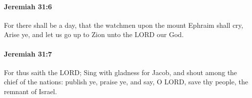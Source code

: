 		\paragraph{Jeremiah 31:6} %
			\label{JEREMIAH-31-6}

			For there shall be a day, that the watchmen upon the mount Ephraim shall cry, Arise ye, and let us go up to Zion unto the LORD our God.


		\paragraph{Jeremiah 31:7} %
			\label{JEREMIAH-31-7}

			For thus saith the LORD; Sing with gladness for Jacob, and shout among the chief of the nations: publish ye, praise ye, and say, O LORD, save thy people, the remnant of Israel.


